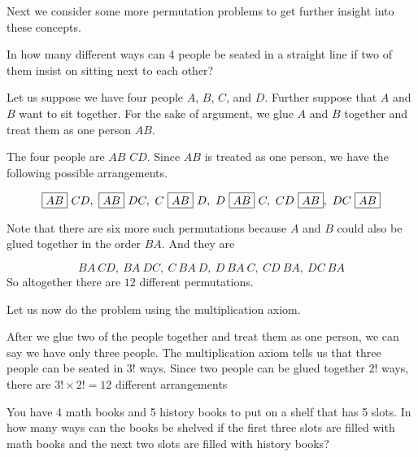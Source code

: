 Next we consider some more permutation problems to get further insight into these concepts.

\begin{example}
    In how many different ways can 4 people be seated in a straight line if two of them insist on sitting next to each other?
\end{example}

\begin{solution}
    Let us suppose we have four people \( A \), \( B \), \( C \), and \( D \). Further suppose that \( A \) and \( B \) want to sit together. For the sake of argument, we glue \( A \) and \( B \) together and treat them as one person \( \boxed{AB} \).

    The four people are \( \boxed{AB} \) \( CD \). Since \( \boxed{AB} \) is treated as one person, we have the following possible arrangements.

    \[
        \boxed{AB}\ CD, \ \boxed{AB}\ DC, \ C\ \boxed{AB}\ D, \ D\ \boxed{AB}\ C, \ CD\ \boxed{AB}, \ DC\ \boxed{AB} \\
    \]

    Note that there are six more such permutations because \( A \) and \( B \) could also be glued together in the order \( \boxed{BA} \). And they are

    \[
        \boxed{BA}\ CD, \ \boxed{BA}\ DC, \ C\ \boxed{BA}\ D, \ D\ \boxed{BA}\ C, \ CD\ \boxed{BA}, \ DC\ \boxed{BA}
    \]
    So altogether there are \( 12 \) different permutations.

    Let us now do the problem using the multiplication axiom.

    After we glue two of the people together and treat them as one person, we can say we have only three people. The multiplication axiom tells us that three people can be seated in \( 3! \) ways. Since two people can be glued together \( 2! \) ways, there are \( 3! \times 2! = 12 \) different arrangements
\end{solution}

\begin{example}
    You have 4 math books and 5 history books to put on a shelf that has 5 slots. In how many ways can the books be shelved if the first three slots are filled with math books and the next two slots are filled with history books?
\end{example}

